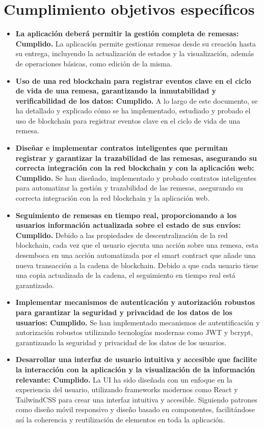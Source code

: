 \section{Cumplimiento objetivos específicos}
\begin{itemize}
    \item \textbf{La aplicación deberá permitir la gestión completa de remesas: Cumplido.} La aplicación permite
gestionar remesas desde su creación hasta su entrega, incluyendo la actualización de estados y la visualización, además de operaciones básicas,
como edición de la misma.
    \item \textbf{ Uso de una red blockchain para registrar eventos clave en el ciclo de
vida de una remesa, garantizando la inmutabilidad y verificabilidad de
los datos: Cumplido.} A lo largo de este documento, se ha detallado y explicado cómo se ha implementado, estudiado y probado el uso de
blockchain para registrar eventos clave en el ciclo de vida de una remesa.
    \item \textbf{Diseñar e implementar contratos inteligentes que permitan registrar
y garantizar la trazabilidad de las remesas, asegurando su correcta
integración con la red blockchain y con la aplicación web: Cumplido.} Se han diseñado, implementado y probado contratos inteligentes para automatizar 
la gestión y trazabilidad de las remesas, asegurando su correcta integración con la red blockchain y la aplicación web.
    \item \textbf{Seguimiento de remesas en tiempo real, proporcionando a los usuarios
información actualizada sobre el estado de sus envíos: Cumplido.} Debido a las propiedades de descentralización de la red blockchain, cada vez que el usuario ejecuta una acción
sobre una remesa, esta desemboca en una acción automatizada por el smart contract que añade una nueva transacción a la cadena de blockchain. Debido a que cada usuario tiene una copia
actualizada de la cadena, el seguimiento en tiempo real está garantizado.
    \item \textbf{Implementar mecanismos de autenticación y autorización robustos para
     garantizar la seguridad y privacidad de los datos de los usuarios: Cumplido.} Se han implementado mecanismos de autentificación y autorización robustos utilizando
        tecnologías modernas como JWT y bcrypt, garantizando la seguridad y privacidad de los datos de los usuarios.
    \item \textbf{Desarrollar una interfaz de usuario intuitiva y accesible que facilite
la interacción con la aplicación y la visualización de la información
relevante: Cumplido.} La UI ha sido diseñada con un enfoque en la experiencia del usuario, utilizando frameworks 
modernos como React y TailwindCSS para crear una interfaz intuitiva y accesible. Siguiendo patrones como diseño móvil responsivo y
diseño basado en componentes, facilitándose así la coherencia y reutilización de elementos en toda la aplicación.
\end{itemize}

